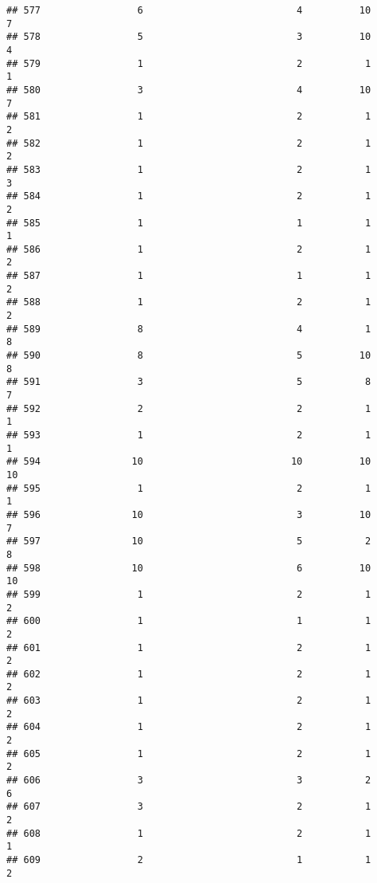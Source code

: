 \documentclass[
]{article}
\begin{document}
\begin{verbatim}
## 577                 6                           4          10               7
## 578                 5                           3          10               4
## 579                 1                           2           1               1
## 580                 3                           4          10               7
## 581                 1                           2           1               2
## 582                 1                           2           1               2
## 583                 1                           2           1               3
## 584                 1                           2           1               2
## 585                 1                           1           1               1
## 586                 1                           2           1               2
## 587                 1                           1           1               2
## 588                 1                           2           1               2
## 589                 8                           4           1               8
## 590                 8                           5          10               8
## 591                 3                           5           8               7
## 592                 2                           2           1               1
## 593                 1                           2           1               1
## 594                10                          10          10              10
## 595                 1                           2           1               1
## 596                10                           3          10               7
## 597                10                           5           2               8
## 598                10                           6          10              10
## 599                 1                           2           1               2
## 600                 1                           1           1               2
## 601                 1                           2           1               2
## 602                 1                           2           1               2
## 603                 1                           2           1               2
## 604                 1                           2           1               2
## 605                 1                           2           1               2
## 606                 3                           3           2               6
## 607                 3                           2           1               2
## 608                 1                           2           1               1
## 609                 2                           1           1               2

\end{verbatim}
\end{document}
